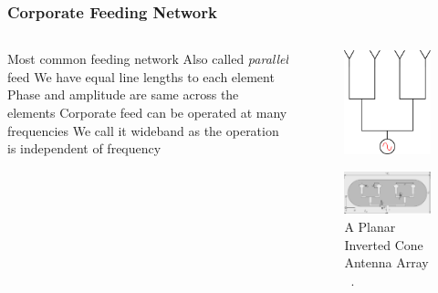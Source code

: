 \documentclass[10pt]{beamer}
\begin{document}
\begin{frame}
    \frametitle{Corporate Feeding Network}
    \begin{columns}[] %
        \begin{column}{.5\textwidth}
            \begin{outline}
                \small
                \1 Most common feeding network
                \2 Also called \textit{parallel} feed
                \1 We have equal line lengths to each element
                \2 Phase and amplitude are same across the elements
                \1 Corporate feed can be operated at many frequencies
                \2 We call it wideband as the operation is independent of frequency
            \end{outline}   
        \end{column}
        \begin{column}{.5\textwidth}
            \small
            \begin{figure}[h!]
                \centering
                \includegraphics[width=.45\textwidth]{corporate.pdf}
            \end{figure}
            \begin{figure}[h!]
                \centering
                \includegraphics[width=.75\textwidth]{PICA Array.pdf}
                \caption{A Planar Inverted Cone Antenna Array \, \footnotemark[1].}
            \end{figure}
        \end{column}%
    \end{columns}
\end{frame}
\end{document}
